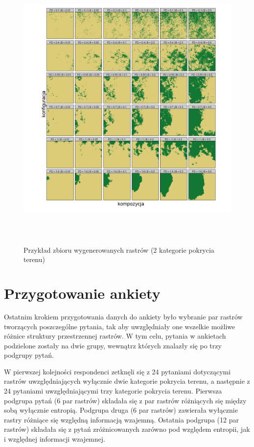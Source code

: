 \documentclass{amuthesis}
\begin{document}
\begin{figure}[t]

{\centering \includegraphics[width=5.72917in,height=5.72917in]{figures/wykres1_2classes.png}

}

\caption{\label{fig-wykres1_2classes}Przykład zbioru wygenerowanych
rastrów (2 kategorie pokrycia terenu)}

\end{figure}

\hypertarget{sec-przygotowanie1}{%
\section{Przygotowanie ankiety}\label{sec-przygotowanie1}}

Ostatnim krokiem przygotowania danych do ankiety było wybranie par
rastrów tworzących poszczególne pytania, tak aby uwzględniały one
wszelkie możliwe różnice struktury przestrzennej rastrów. W tym celu,
pytania w ankietach podzielone zostały na dwie grupy, wewnątrz których
znalazły się po trzy podgrupy pytań.

W pierwszej kolejności respondenci zetknęli się z 24 pytaniami
dotyczącymi rastrów uwzględniających wyłącznie dwie kategorie pokrycia
terenu, a następnie z 24 pytaniami uwzględniającymi trzy kategorie
pokrycia terenu. Pierwsza podgrupa pytań (6 par rastrów) składała się z
par rastrów różniących się między sobą wyłącznie entropią. Podgrupa
druga (6 par rastrów) zawierała wyłącznie rastry różniące się względną
informacją wzajemną. Ostatnia podgrupa (12 par rastrów) składała się z
pytań zróżnicowanych zarówno pod względem entropii, jak i względnej
informacji wzajemnej.
\end{document}
